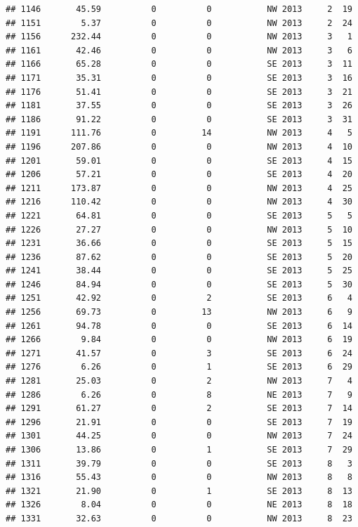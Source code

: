 \documentclass[
]{article}
\begin{document}
\begin{verbatim}
## 1146       45.59          0          0           NW 2013     2  19
## 1151        5.37          0          0           NW 2013     2  24
## 1156      232.44          0          0           NW 2013     3   1
## 1161       42.46          0          0           NW 2013     3   6
## 1166       65.28          0          0           SE 2013     3  11
## 1171       35.31          0          0           SE 2013     3  16
## 1176       51.41          0          0           SE 2013     3  21
## 1181       37.55          0          0           SE 2013     3  26
## 1186       91.22          0          0           SE 2013     3  31
## 1191      111.76          0         14           NW 2013     4   5
## 1196      207.86          0          0           NW 2013     4  10
## 1201       59.01          0          0           SE 2013     4  15
## 1206       57.21          0          0           SE 2013     4  20
## 1211      173.87          0          0           NW 2013     4  25
## 1216      110.42          0          0           NW 2013     4  30
## 1221       64.81          0          0           SE 2013     5   5
## 1226       27.27          0          0           NW 2013     5  10
## 1231       36.66          0          0           SE 2013     5  15
## 1236       87.62          0          0           SE 2013     5  20
## 1241       38.44          0          0           SE 2013     5  25
## 1246       84.94          0          0           SE 2013     5  30
## 1251       42.92          0          2           SE 2013     6   4
## 1256       69.73          0         13           NW 2013     6   9
## 1261       94.78          0          0           SE 2013     6  14
## 1266        9.84          0          0           NW 2013     6  19
## 1271       41.57          0          3           SE 2013     6  24
## 1276        6.26          0          1           SE 2013     6  29
## 1281       25.03          0          2           NW 2013     7   4
## 1286        6.26          0          8           NE 2013     7   9
## 1291       61.27          0          2           SE 2013     7  14
## 1296       21.91          0          0           SE 2013     7  19
## 1301       44.25          0          0           NW 2013     7  24
## 1306       13.86          0          1           SE 2013     7  29
## 1311       39.79          0          0           SE 2013     8   3
## 1316       55.43          0          0           NW 2013     8   8
## 1321       21.90          0          1           SE 2013     8  13
## 1326        8.04          0          0           NE 2013     8  18
## 1331       32.63          0          0           NW 2013     8  23

\end{verbatim}
\end{document}
